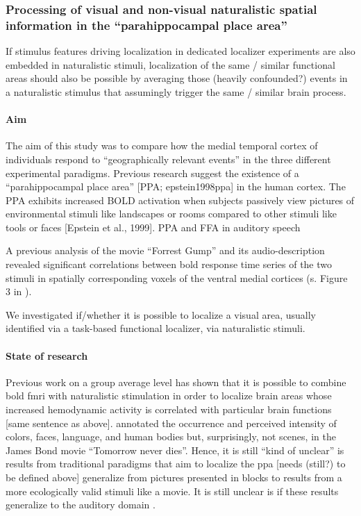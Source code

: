 \subsubsection{Processing of visual and non-visual naturalistic spatial
information in the ``parahippocampal place area''}

%
If stimulus features driving localization in dedicated localizer experiments are
also embedded in naturalistic stimuli, localization of the same / similar
functional areas should also be possible by averaging those (heavily
confounded?) events in a naturalistic stimulus that assumingly trigger the same
/ similar brain process.

%
\paragraph{Aim}

%
The aim of this study was to compare how the medial temporal cortex of
individuals respond to “geographically relevant events” in the  three different
experimental paradigms.
%
Previous research suggest the existence of a ``parahippocampal place area'' [PPA;
epstein1998ppa] in the human cortex.
%
The PPA exhibits increased BOLD activation
when subjects passively view pictures of environmental stimuli like landscapes
or rooms compared to other stimuli like tools or faces [Epstein et al., 1999].
PPA and FFA in auditory speech \citep{aziz2008modulation}

%
A previous analysis \citep{hanke2016simultaneous} of the movie ``Forrest Gump''
and its audio-description revealed significant correlations between \ac{bold}
response time series of the two stimuli in spatially corresponding voxels of the
ventral medial cortices (s. Figure 3 in \citep{hanke2016simultaneous}).
%


We investigated if/whether it is possible to localize a visual area, usually
identified via a task-based functional localizer, via naturalistic stimuli.


\paragraph{State of research}

Previous work on a group average level has shown that it is possible to combine
\ac{bold} \ac{fmri} with naturalistic stimulation in order to localize brain
areas whose increased hemodynamic activity is correlated with particular brain
functions \citep{bartels2004mapping} [same sentence as above].
%
\citep{bartels2004mapping} annotated the occurrence and perceived intensity of
colors, faces, language, and human bodies but, surprisingly, not scenes, in the
James Bond movie ``Tomorrow never dies''.
%
Hence, it is still ``kind of unclear'' is results from traditional paradigms
that aim to localize the \ac{ppa} [needs (still?) to be defined above]
generalize from pictures presented in blocks to results from a more ecologically
valid stimuli like a movie.
%
It is still unclear is if these results generalize to the auditory domain
\citep{aziz2008modulation}.

